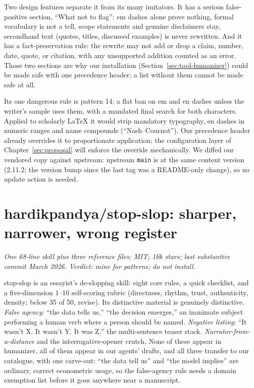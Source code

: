 Two design features separate it from its many imitators. It has a serious
false-positive section, ``What not to flag'': em dashes alone prove
nothing, formal vocabulary is not a tell, scope statements and genuine
disclaimers stay, secondhand text (quotes, titles, discussed examples) is
never rewritten. And it has a fact-preservation rule: the rewrite may not
add or drop a claim, number, date, quote, or citation, with any unsupported
addition counted as an error. Those two sections are why our installation
(Section~\ref{sec:tool-humanizer}) could be made safe with one precedence
header; a list without them cannot be made safe at all.

Its one dangerous rule is pattern 14: a flat ban on em and en dashes unless
the writer's sample uses them, with a mandated final search for both
characters. Applied to scholarly LaTeX it would strip mandatory typography,
en dashes in numeric ranges and name compounds (``Nash--Cournot''). Our
precedence header already overrides it to proportionate application; the
configuration layer of Chapter~\ref{sec:proposal} will enforce the override
mechanically. We diffed our vendored copy against upstream: upstream
\texttt{main} is at the same content version (2.11.2; the version bump since
the last tag was a README-only change), so no update action is needed.

\section{hardikpandya/stop-slop: sharper, narrower, wrong register}
\label{sec:oss-stopslop}

\emph{One 68-line skill plus three reference files; MIT; 16k stars; last
substantive commit March 2026. Verdict: mine for patterns; do not install.}

stop-slop is an essayist's de-slopping skill: eight core rules, a quick
checklist, and a five-dimension 1--10 self-scoring rubric (directness,
rhythm, trust, authenticity, density; below 35 of 50, revise). Its
distinctive material is genuinely distinctive. \emph{False agency}: ``the
data tells us,'' ``the decision emerges,'' an inanimate subject performing a
human verb where a person should be named. \emph{Negative listing}: ``It
wasn't X. It wasn't Y. It was Z,'' the multi-sentence teaser stack.
\emph{Narrator-from-a-distance} and the interrogative-opener crutch. None of
these appear in humanizer, all of them appear in our agents' drafts, and all
three transfer to our catalogue, with one carve-out: ``the data tell us'' and
``the model implies'' are ordinary, correct econometric usage, so the false-agency
rule needs a domain exemption list before it goes anywhere near a manuscript.

